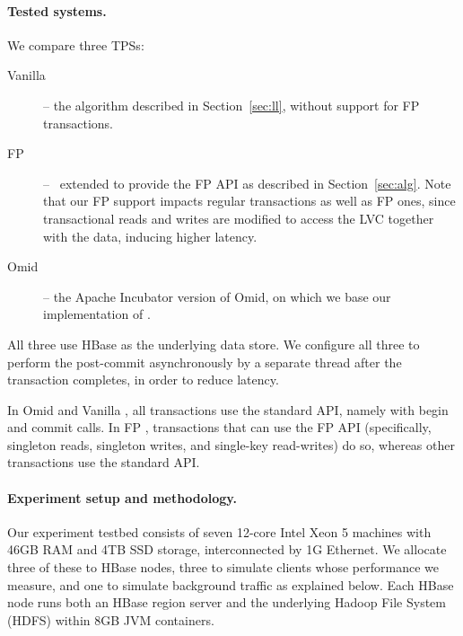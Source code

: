 

\paragraph{Tested systems.}

We compare three TPSs: 
\begin{description}
\item[Vanilla \sys] -- the algorithm described in Section~\ref{sec:ll}, without support for FP transactions.
\item[FP \sys] -- \sys\ extended to provide the FP API as described in Section~\ref{sec:alg}. Note that 
our FP support impacts regular transactions as well as FP ones,
since transactional reads and writes are modified to access the LVC together with the data, 
inducing higher latency.
\item[Omid] -- the Apache Incubator version of Omid, on which we base
our implementation of \sys. 
\end{description}

All three use HBase as the underlying data store. 
We configure all three to perform the post-commit asynchronously by a separate thread after the transaction
completes, in order to reduce latency.

In Omid and Vanilla \sys, all transactions use the standard API, namely with begin and commit calls.
In FP \sys, transactions that can use the FP API (specifically, singleton reads, singleton writes, 
and single-key read-writes) do so, whereas other transactions use the standard API.

\paragraph{Experiment setup and methodology.}

Our experiment testbed consists of seven 12-core Intel Xeon 5 machines with 46GB RAM and 4TB 
SSD storage, interconnected by 1G Ethernet. We allocate three of these to HBase nodes, 
three to simulate clients whose performance we measure, and one to simulate background traffic
as explained below. 
 Each HBase node runs both an HBase region server and the underlying 
Hadoop File System (HDFS) within 8GB JVM containers. 

